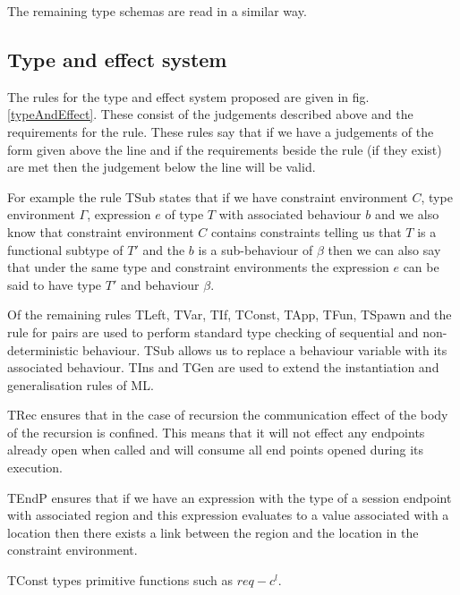 The remaining type schemas are read in a similar way. 


\subsection{Type and effect system} 

The rules for the type and effect system proposed are given in fig. \ref{typeAndEffect}. These consist of the judgements described above and the requirements for the rule. These rules say that if we have a judgements of the form given above the line and if the requirements beside the rule (if they exist) are met then the judgement below the line will be valid.

For example the rule TSub states that if we have constraint environment $C$, type environment $\Gamma$, expression $e$ of type $T$ with associated behaviour $b$ and we also know that constraint environment $C$ contains constraints telling us that $T$ is a functional subtype of $T'$ and the $b$ is a sub-behaviour of $\beta$ then we can also say that under the same type and constraint environments the expression $e$ can be said to have type $T'$ and behaviour $\beta$.

Of the remaining rules TLeft, TVar, TIf, TConst, TApp, TFun, TSpawn and the rule for pairs are used to perform standard type checking of sequential and non-deterministic behaviour. TSub allows us to replace a behaviour variable with its associated behaviour. TIns and TGen are used to extend the instantiation and generalisation rules of ML. 

TRec ensures that in the case of recursion the communication effect of the body of the recursion is confined. This means that it will not effect any endpoints already open when called and will consume all end points opened during its execution. 

TEndP ensures that if we have an expression with the type of a session endpoint with associated region and this expression evaluates to a value associated with a location then there exists a link between the region and the location in the constraint environment. 

TConst types primitive functions such as $req-c^l$.

